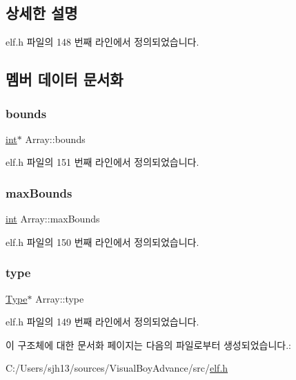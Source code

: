 \subsection{상세한 설명}


elf.\+h 파일의 148 번째 라인에서 정의되었습니다.



\subsection{멤버 데이터 문서화}
\mbox{\label{struct_array_a2d2cd201a0203a12d6f5e7b8a34ab1ad}} 
\subsubsection{\texorpdfstring{bounds}{bounds}}
{\footnotesize\ttfamily \mbox{\hyperlink{_util_8cpp_a0ef32aa8672df19503a49fab2d0c8071}{int}}$\ast$ Array\+::bounds}



elf.\+h 파일의 151 번째 라인에서 정의되었습니다.

\mbox{\label{struct_array_ac416f8022b0d22cb470b0e5cc1e9b356}} 
\subsubsection{\texorpdfstring{max\+Bounds}{maxBounds}}
{\footnotesize\ttfamily \mbox{\hyperlink{_util_8cpp_a0ef32aa8672df19503a49fab2d0c8071}{int}} Array\+::max\+Bounds}



elf.\+h 파일의 150 번째 라인에서 정의되었습니다.

\mbox{\label{struct_array_aebd7ba43475f7f6461e4343a7ffce0a7}} 
\subsubsection{\texorpdfstring{type}{type}}
{\footnotesize\ttfamily \mbox{\hyperlink{struct_type}{Type}}$\ast$ Array\+::type}



elf.\+h 파일의 149 번째 라인에서 정의되었습니다.



이 구조체에 대한 문서화 페이지는 다음의 파일로부터 생성되었습니다.\+:\begin{DoxyCompactItemize}
\item 
C\+:/\+Users/sjh13/sources/\+Visual\+Boy\+Advance/src/\mbox{\hyperlink{elf_8h}{elf.\+h}}\end{DoxyCompactItemize}
